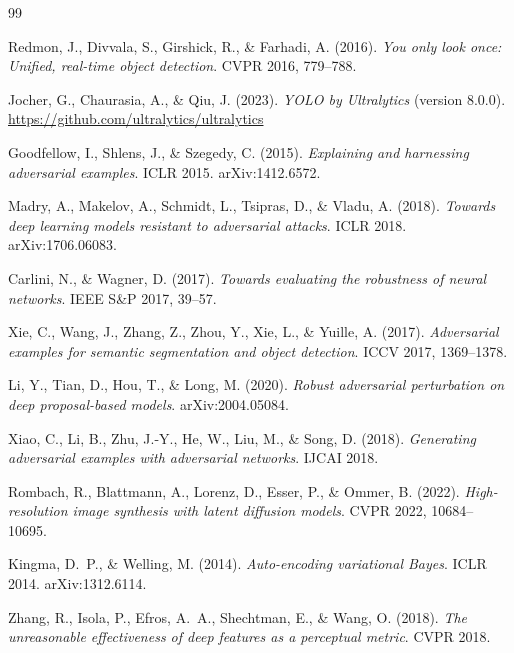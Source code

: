 \documentclass[12pt,a4paper]{report}
\begin{document}

\begin{thebibliography}{99}

Redmon, J., Divvala, S., Girshick, R., \& Farhadi, A. (2016).
\textit{You only look once: Unified, real-time object detection}.
CVPR 2016, 779--788.

Jocher, G., Chaurasia, A., \& Qiu, J. (2023).
\textit{YOLO by Ultralytics} (version 8.0.0).
\url{https://github.com/ultralytics/ultralytics}

Goodfellow, I., Shlens, J., \& Szegedy, C. (2015).
\textit{Explaining and harnessing adversarial examples}.
ICLR 2015. arXiv:1412.6572.

Madry, A., Makelov, A., Schmidt, L., Tsipras, D., \& Vladu, A. (2018).
\textit{Towards deep learning models resistant to adversarial attacks}.
ICLR 2018. arXiv:1706.06083.

Carlini, N., \& Wagner, D. (2017).
\textit{Towards evaluating the robustness of neural networks}.
IEEE S\&P 2017, 39--57.

Xie, C., Wang, J., Zhang, Z., Zhou, Y., Xie, L., \& Yuille, A. (2017).
\textit{Adversarial examples for semantic segmentation and object detection}.
ICCV 2017, 1369--1378.

Li, Y., Tian, D., Hou, T., \& Long, M. (2020).
\textit{Robust adversarial perturbation on deep proposal-based models}.
arXiv:2004.05084.

Xiao, C., Li, B., Zhu, J.-Y., He, W., Liu, M., \& Song, D. (2018).
\textit{Generating adversarial examples with adversarial networks}.
IJCAI 2018.

Rombach, R., Blattmann, A., Lorenz, D., Esser, P., \& Ommer, B. (2022).
\textit{High-resolution image synthesis with latent diffusion models}.
CVPR 2022, 10684--10695.

Kingma, D.~P., \& Welling, M. (2014).
\textit{Auto-encoding variational Bayes}.
ICLR 2014. arXiv:1312.6114.

Zhang, R., Isola, P., Efros, A.~A., Shechtman, E., \& Wang, O. (2018).
\textit{The unreasonable effectiveness of deep features as a perceptual metric}.
CVPR 2018.


\end{thebibliography}
\end{document}
